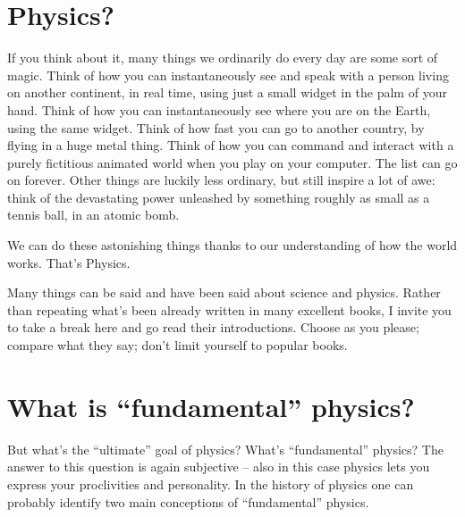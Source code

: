 \documentclass[a4paper,12pt,%
onecolumn,oneside,%
british%
]{memoir}
\renewcommand*{\|}[1][]{\nonscript\:#1\vert\nonscript\:\mathopen{}}
\begin{document}
\section{Physics?}
\label{sec:physics_general}


If you think about it, many things we ordinarily do every day are some sort of magic. Think of how you can instantaneously see and speak with a person living on another continent, in real time, using just a small widget in the palm of your hand. Think of how you can instantaneously see where you are on the Earth, using the same widget. Think of how fast you can go to another country, by flying in a huge metal thing. Think of how you can command and interact with a purely fictitious animated world when you play on your computer. The list can go on forever. Other things are luckily less ordinary, but still inspire a lot of awe: think of the devastating power unleashed by something roughly as small as a tennis ball, in an atomic bomb.

We can do these astonishing things thanks to our understanding of how the world works. That's Physics.

\medskip

Many things can be said and have been said about science and physics. Rather than repeating what's been already written in many excellent books, I invite you to take a break here and go read their introductions. Choose as you please; compare what they say; don't limit yourself to popular books.




\section{What is \enquote{fundamental} physics?}
\label{sec:fundamental_physics}

But what's the \enquote{ultimate} goal of physics? What's \enquote{fundamental} physics? The answer to this question is again subjective -- also in this case physics lets you express your proclivities and personality. In the history of physics one can probably identify two main conceptions of \enquote{fundamental} physics.
\end{document}
